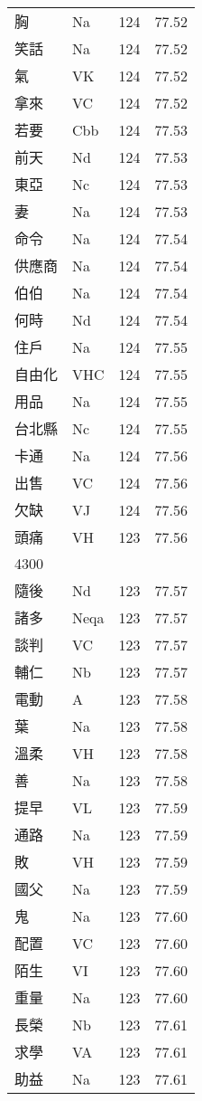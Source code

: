 \documentclass[twocolumn]{book}
\begin{document}
\begin{supertabular}{llrr}
胸 & Na & 124 &  77.52\\
笑話 & Na & 124 &  77.52\\
氣 & VK & 124 &  77.52\\
拿來 & VC & 124 &  77.52\\
若要 & Cbb & 124 &  77.53\\
前天 & Nd & 124 &  77.53\\
東亞 & Nc & 124 &  77.53\\
妻 & Na & 124 &  77.53\\
命令 & Na & 124 &  77.54\\
供應商 & Na & 124 &  77.54\\
伯伯 & Na & 124 &  77.54\\
何時 & Nd & 124 &  77.54\\
住戶 & Na & 124 &  77.55\\
自由化 & VHC & 124 &  77.55\\
用品 & Na & 124 &  77.55\\
台北縣 & Nc & 124 &  77.55\\
卡通 & Na & 124 &  77.56\\
出售 & VC & 124 &  77.56\\
欠缺 & VJ & 124 &  77.56\\
頭痛 & VH & 123 &  77.56\\
4300\\
隨後 & Nd & 123 &  77.57\\
諸多 & Neqa & 123 &  77.57\\
談判 & VC & 123 &  77.57\\
輔仁 & Nb & 123 &  77.57\\
電動 & A & 123 &  77.58\\
葉 & Na & 123 &  77.58\\
溫柔 & VH & 123 &  77.58\\
善 & Na & 123 &  77.58\\
提早 & VL & 123 &  77.59\\
通路 & Na & 123 &  77.59\\
敗 & VH & 123 &  77.59\\
國父 & Na & 123 &  77.59\\
鬼 & Na & 123 &  77.60\\
配置 & VC & 123 &  77.60\\
陌生 & VI & 123 &  77.60\\
重量 & Na & 123 &  77.60\\
長榮 & Nb & 123 &  77.61\\
求學 & VA & 123 &  77.61\\
助益 & Na & 123 &  77.61\\

\end{supertabular}
\end{document}
